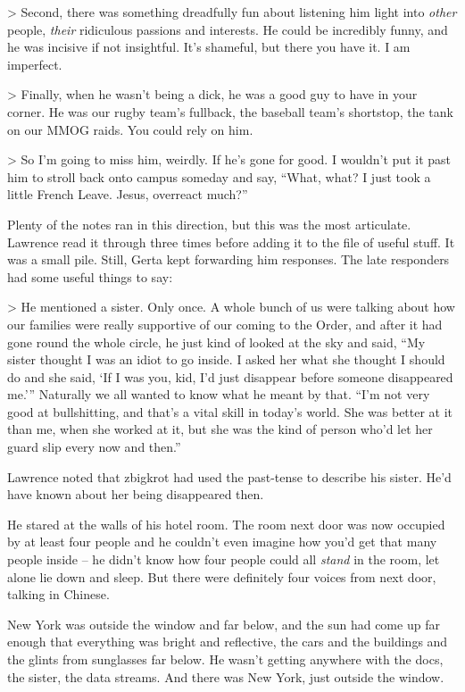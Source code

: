 > Second, there was something dreadfully fun about listening him light 
into \emph{other} people, \emph{their} ridiculous passions and 
interests. He could be incredibly funny, and he was incisive if not 
insightful. It's shameful, but there you have it. I am imperfect.

> Finally, when he wasn't being a dick, he was a good guy to have in 
your corner. He was our rugby team's fullback, the baseball team's 
shortstop, the tank on our MMOG raids. You could rely on him.

> So I'm going to miss him, weirdly. If he's gone for good. I wouldn't 
put it past him to stroll back onto campus someday and say, “What, 
what? I just took a little French Leave. Jesus, overreact much?”

Plenty of the notes ran in this direction, but this was the most 
articulate. Lawrence read it through three times before adding it to 
the file of useful stuff. It was a small pile. Still, Gerta kept 
forwarding him responses. The late responders had some useful things to 
say:

> He mentioned a sister. Only once. A whole bunch of us were talking 
about how our families were really supportive of our coming to the 
Order, and after it had gone round the whole circle, he just kind of 
looked at the sky and said, “My sister thought I was an idiot to go 
inside. I asked her what she thought I should do and she said, `If I 
was you, kid, I'd just disappear before someone disappeared me.'” 
Naturally we all wanted to know what he meant by that. “I'm not very 
good at bullshitting, and that's a vital skill in today's world. She 
was better at it than me, when she worked at it, but she was the kind 
of person who'd let her guard slip every now and then.”

Lawrence noted that zbigkrot had used the past-tense to describe his 
sister. He'd have known about her being disappeared then.

He stared at the walls of his hotel room. The room next door was now 
occupied by at least four people and he couldn't even imagine how you'd 
get that many people inside -- he didn't know how four people could all 
\emph{stand} in the room, let alone lie down and sleep. But there were 
definitely four voices from next door, talking in Chinese.

New York was outside the window and far below, and the sun had come up 
far enough that everything was bright and reflective, the cars and the 
buildings and the glints from sunglasses far below. He wasn't getting 
anywhere with the docs, the sister, the data streams. And there was New 
York, just outside the window.

